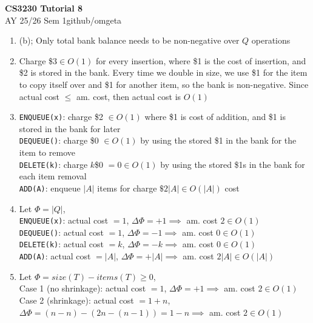 \documentclass[12pt, a4paper]{article}
\newcommand{\mytitle}{CS3230 Tutorial 8}
\newcommand{\myauthor}{github/omgeta}
\newcommand{\mydate}{AY 25/26 Sem 1}
\begin{document}
\raggedright
\footnotesize
\begin{center}
{\normalsize{\textbf{\mytitle}}} \\
{\footnotesize{\mydate\hspace{2pt}\textemdash\hspace{2pt}\myauthor}}
\end{center}
\begin{enumerate}[Q\arabic*).]
  \item (b); Only total bank balance needs to be non-negative over $Q$ operations 

  \item Charge \$3$\in O(1)$ for every insertion, where \$1 is the cost of insertion, and \$2 is stored in the bank. Every time we double in size, we use \$1 for the item to copy itself over and \$1 for another item, so the bank is non-negative. Since actual cost $\leq$ am. cost, then actual cost is $O(1)$ 

  \item \lstinline|ENQUEUE(x)|: charge \$2 $\in O(1)$ where \$1 is cost of addition, and \$1 is stored in the bank for later\\ 
    \lstinline|DEQUEUE()|: charge \$0 $\in O(1)$ by using the stored \$1 in the bank for the item to remove\\
    \lstinline|DELETE(k)|: charge $k$\$0 $= 0\in O(1)$ by using the stored \$1s in the bank for each item removal\\
    \lstinline|ADD(A)|: enqueue $|A|$ items for charge $\$2|A| \in O(|A|)$ cost

  \item Let $\Phi = |Q|$,\\
  \lstinline|ENQUEUE(x)|: actual cost $= 1$, $\Delta\Phi = +1 \implies $ am. cost $2 \in O(1)$\\ 
  \lstinline|DEQUEUE()|: actual cost $= 1$, $\Delta\Phi = -1 \implies $ am. cost $0 \in O(1)$\\ 
  \lstinline|DELETE(k)|: actual cost $= k$, $\Delta\Phi = -k \implies $ am. cost $0 \in O(1)$\\ 
  \lstinline|ADD(A)|: actual cost $= |A|$, $\Delta\Phi = +|A| \implies $ am. cost $2|A| \in O(|A|)$\\ 

  \item Let $\Phi = size(T) - items(T) \geq 0$,\\
    Case 1 (no shrinkage): actual cost $= 1$, $\Delta\Phi = +1 \implies $ am. cost $2 \in O(1)$\\
    Case 2 (shrinkage): actual cost $= 1 + n$, $\Delta\Phi = (n - n) - (2n - (n-1)) = 1 - n \implies$ am. cost $2 \in O(1)$
\end{enumerate}
\end{document}
